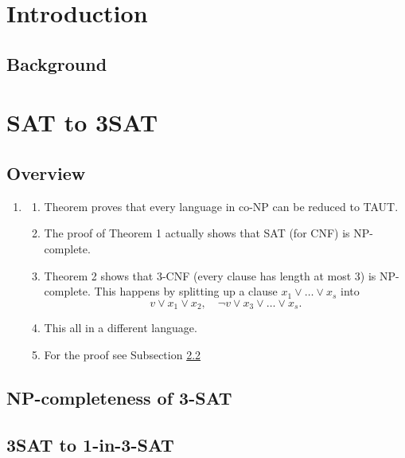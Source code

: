 \documentclass[a4paper]{report}
\begin{document}
\chapter {Introduction}
\label{cha:Introduction}

\section{Background}
\label{sec:Background}



\chapter{SAT to 3SAT}
\label{cha:sat13}


\section{Overview}
\label{sec:sat13Overview}

\begin{enumerate}
\item \cite{Cook1971NP}
  \begin{enumerate}
  \item Theorem proves that every language in co-NP can be reduced to TAUT.
  \item The proof of Theorem 1 actually shows that SAT (for CNF) is NP-complete.
  \item Theorem 2 shows that 3-CNF (every clause has length at most 3) is NP-complete. This happens by splitting up a clause $x_1 \vee \dots \vee x_s$ into
    \begin{displaymath}
      v \vee x_1 \vee x_2, \quad \neg v \vee x_3 \vee \dots \vee x_s.
    \end{displaymath}
  \item This all in a different language.
  \item For the proof see Subsection \ref{sec:3SATNPcomp}
  \end{enumerate}
\end{enumerate}



\section{NP-completeness of 3-SAT}
\label{sec:3SATNPcomp}







\section{3SAT to 1-in-3-SAT}
\label{sec:3satto13}





\end{document}
